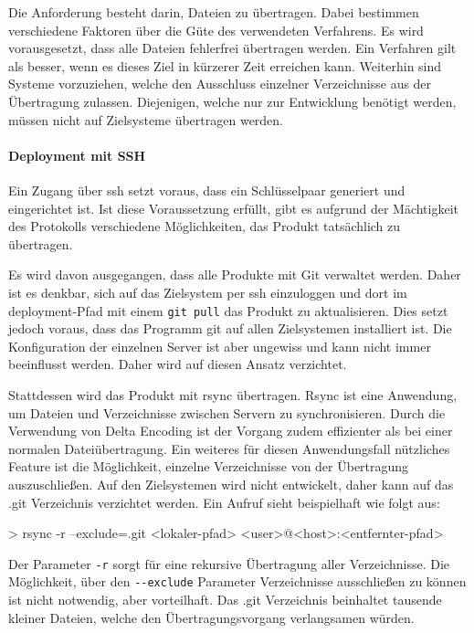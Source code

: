 Die Anforderung besteht darin, Dateien zu übertragen. Dabei bestimmen verschiedene Faktoren über die Güte des verwendeten Verfahrens. Es wird vorausgesetzt, dass alle Dateien fehlerfrei übertragen werden. Ein Verfahren gilt als besser, wenn es dieses Ziel in kürzerer Zeit erreichen kann. Weiterhin sind Systeme vorzuziehen, welche den Ausschluss einzelner Verzeichnisse aus der Übertragung zulassen. Diejenigen, welche nur zur Entwicklung benötigt werden, müssen nicht auf Zielsysteme übertragen werden.

\paragraph{Deployment mit SSH} %
\label{par:deployment_mit_ssh}

Ein Zugang über \gls{ssh} setzt voraus, dass ein Schlüsselpaar generiert und eingerichtet ist. Ist diese Voraussetzung erfüllt, gibt es aufgrund der Mächtigkeit des Protokolls verschiedene Möglichkeiten, das Produkt tatsächlich zu übertragen.

Es wird davon ausgegangen, dass alle Produkte mit Git verwaltet werden. Daher ist es denkbar, sich auf das Zielsystem per \gls{ssh} einzuloggen und dort im \Gls{deployment}-Pfad mit einem \lstinline!git pull! das Produkt zu aktualisieren. Dies setzt jedoch voraus, dass das Programm git auf allen Zielsystemen installiert ist. Die Konfiguration der einzelnen Server ist aber ungewiss und kann nicht immer beeinflusst werden. Daher wird auf diesen Ansatz verzichtet.

Stattdessen wird das Produkt mit rsync übertragen. Rsync ist eine Anwendung, um Dateien und Verzeichnisse zwischen Servern zu synchronisieren. Durch die Verwendung von Delta Encoding ist der Vorgang zudem effizienter als bei einer normalen Dateiübertragung. Ein weiteres für diesen Anwendungsfall nützliches Feature ist die Möglichkeit, einzelne Verzeichnisse von der Übertragung auszuschließen. Auf den Zielsystemen wird nicht entwickelt, daher kann auf das .git Verzeichnis verzichtet werden. Ein Aufruf sieht beispielhaft wie folgt aus:

> rsync -r --exclude=.git <lokaler-pfad> <user>@<host>:<entfernter-pfad>

Der Parameter \lstinline!-r! sorgt für eine rekursive Übertragung aller Verzeichnisse. Die Möglichkeit, über den \lstinline!--exclude! Parameter Verzeichnisse ausschließen zu können ist nicht notwendig, aber vorteilhaft. Das .git Verzeichnis beinhaltet tausende kleiner Dateien, welche den Übertragungsvorgang verlangsamen würden.

